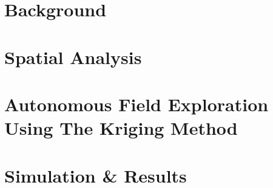 \documentclass[11pt]{ucthesis}
\begin{document}



\begin{frontmatter}

\maketitle
\copyrightpage

\tableofcontents
\listoffigures

\end{frontmatter}







\part{Background}



\part{Spatial Analysis}


\part{Autonomous Field Exploration Using The Kriging Method}



\part{Simulation \& Results}




%



\nocite{*}




\appendix

\end{document}
